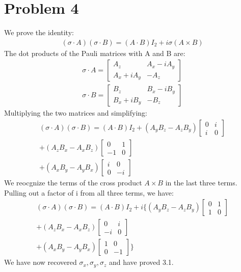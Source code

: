 \documentclass[a4paper,12pt]{article}
\numberwithin{equation}{section}
\begin{document}
\section{Problem 4}
We prove the identity:
\begin{gather}
 (\sigma\cdot A)(\sigma\cdot B)=(A\cdot B)I_2+i\sigma(A\times B)
\end{gather}
The dot products of the Pauli matrices with A and B are:
\begin{gather}
 \sigma\cdot A = \begin{bmatrix}A_z & A_x-iA_y\\ A_x+iA_y & -A_z\end{bmatrix}\\
 \sigma\cdot B = \begin{bmatrix}B_z & B_x-iB_y\\ B_x+iB_y & -B_z\end{bmatrix}
\end{gather}
Multiplying the two matrices and simplifying:
\begin{equation}
\begin{split}
 (\sigma\cdot A)(\sigma\cdot B)=(A\cdot B)I_2+(A_yB_z-A_zB_y)\begin{bmatrix}0 & i\\ i &  0\end{bmatrix}\\
     +(A_zB_x-A_xB_z)\begin{bmatrix}0 & 1\\ -1 &  0\end{bmatrix}\\ 
     +(A_xB_y-A_yB_x)\begin{bmatrix}i & 0\\ 0 & -i\end{bmatrix}
\end{split}
\end{equation}
We reocgnize the terms of the cross product $A\times B$ in the last three terms.
Pulling out a factor of i from all three terms, we have:
\begin{equation}
 \begin{split}
  (\sigma\cdot A)(\sigma\cdot B)=(A\cdot B)I_2+i \{ (A_yB_z-A_zB_y)\begin{bmatrix}0 & 1\\ 1 &  0\end{bmatrix}\\
     +(A_zB_x-A_xB_z)\begin{bmatrix}0 & i\\ -i &  0\end{bmatrix}\\ 
     +(A_xB_y-A_yB_x)\begin{bmatrix}1 & 0\\ 0 & -1\end{bmatrix}\}
 \end{split}
\end{equation}
We have now recovered $\sigma_x,\sigma_y, \sigma_z$ and have proved 3.1.
\end{document}
